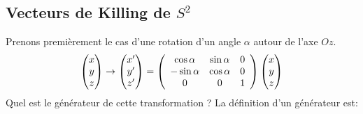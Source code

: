 \subsection{Vecteurs de Killing de $S^2$}
Prenons premièrement le cas d'une rotation d'un angle $\alpha$ autour de l'axe $Oz$.
\begin{equation}
    \begin{pmatrix}
x\\
y\\
z
\end{pmatrix} \rightarrow \begin{pmatrix}
x'\\
y'\\
z'
\end{pmatrix} = \left(\begin{array}{ccc}
    \cos \alpha & \sin\alpha & 0 \\
    -\sin\alpha & \cos \alpha & 0 \\
    0 & 0 & 1 
\end{array}
\right) 
\begin{pmatrix}
x\\
y\\
z
\end{pmatrix}
\end{equation}
Quel est le générateur de cette transformation ? La définition d'un générateur est:

